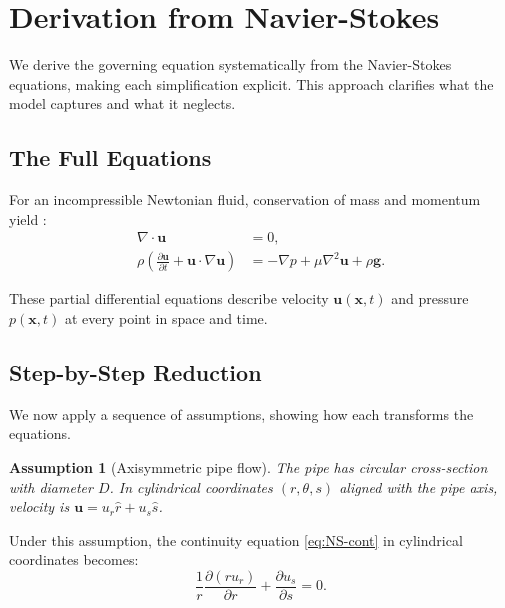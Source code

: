 \documentclass[11pt,a4paper]{article}
\newtheorem{assumption}{Assumption}
\theoremstyle{definition}
\begin{document}
\section{Derivation from Navier-Stokes}
\label{sec:navier-stokes}

We derive the governing equation systematically from the Navier-Stokes equations, making each simplification explicit. This approach clarifies what the model captures and what it neglects.

\subsection{The Full Equations}

For an incompressible Newtonian fluid, conservation of mass and momentum yield \citep{batchelor1967introduction}:
\begin{align}
  \nabla \cdot \mathbf{u} &= 0, \label{eq:NS-cont} \\
  \rho\left(\frac{\partial \mathbf{u}}{\partial t} + \mathbf{u} \cdot \nabla\mathbf{u}\right) &= -\nabla p + \mu\nabla^2\mathbf{u} + \rho\mathbf{g}. \label{eq:NS-mom}
\end{align}

These partial differential equations describe velocity $\mathbf{u}(\mathbf{x},t)$ and pressure $p(\mathbf{x},t)$ at every point in space and time.

\subsection{Step-by-Step Reduction}

We now apply a sequence of assumptions, showing how each transforms the equations.

\begin{assumption}[Axisymmetric pipe flow]
The pipe has circular cross-section with diameter $D$. In cylindrical coordinates $(r, \theta, s)$ aligned with the pipe axis, velocity is $\mathbf{u} = u_r\hat{r} + u_s\hat{s}$.
\end{assumption}

Under this assumption, the continuity equation \eqref{eq:NS-cont} in cylindrical coordinates becomes:
\begin{equation}
  \frac{1}{r}\frac{\partial(r u_r)}{\partial r} + \frac{\partial u_s}{\partial s} = 0.
  \label{eq:cont-cyl}
\end{equation}
\end{document}
